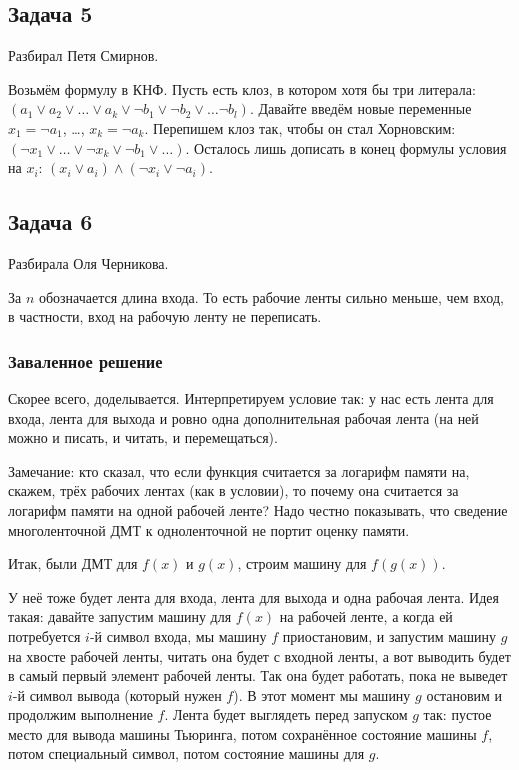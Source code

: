 \subsection{Задача 5}
	Разбирал Петя Смирнов.

	Возьмём формулу в КНФ.
	Пусть есть клоз, в котором хотя бы три литерала: $(a_1 \lor a_2 \lor \dots \lor a_k \lor \lnot b_1 \lor \lnot b_2 \lor \dots \lnot b_l)$.
	Давайте введём новые переменные $x_1 = \lnot a_1$, \dots, $x_k = \lnot a_k$.
	Перепишем клоз так, чтобы он стал Хорновским: $(\lnot x_1 \lor \ldots \lor \lnot x_k \lor \lnot b_1 \lor \dots)$.
	Осталось лишь дописать в конец формулы условия на $x_i$: $(x_i \lor a_i) \land (\lnot x_i \lor \lnot a_i)$.

\subsection{Задача 6}
	Разбирала Оля Черникова.

	За $n$ обозначается длина входа.
	То есть рабочие ленты сильно меньше, чем вход, в частности,
	вход на рабочую ленту не переписать.

	\subsubsection{Заваленное решение}
	Скорее всего, доделывается.
	Интерпретируем условие так: у нас есть лента для входа, лента для выхода и ровно одна дополнительная
	рабочая лента (на ней можно и писать, и читать, и перемещаться).
	\begin{Rem}
		Замечание: кто сказал, что если функция считается за логарифм памяти на, скажем, трёх рабочих лентах (как в условии),
		то почему она считается за логарифм памяти на одной рабочей ленте?
		Надо честно показывать, что сведение многоленточной ДМТ к одноленточной не портит оценку памяти.
	\end{Rem}
	Итак, были ДМТ для $f(x)$ и $g(x)$, строим машину для $f(g(x))$.
	
	У неё тоже будет лента для входа, лента для выхода и одна рабочая лента.
	Идея такая: давайте запустим машину для $f(x)$ на рабочей ленте, а когда ей потребуется
	$i$-й символ входа, мы машину $f$ приостановим, и запустим машину $g$ на хвосте рабочей
	ленты, читать она будет с входной ленты, а вот выводить будет в самый первый элемент рабочей ленты.
	Так она будет работать, пока не выведет $i$-й символ вывода (который нужен $f$).
	В этот момент мы машину $g$ остановим и продолжим выполнение $f$.
	Лента будет выглядеть перед запуском $g$ так: пустое место для вывода машины Тьюринга,
	потом сохранённое состояние машины $f$, потом специальный символ, потом состояние машины для $g$.

